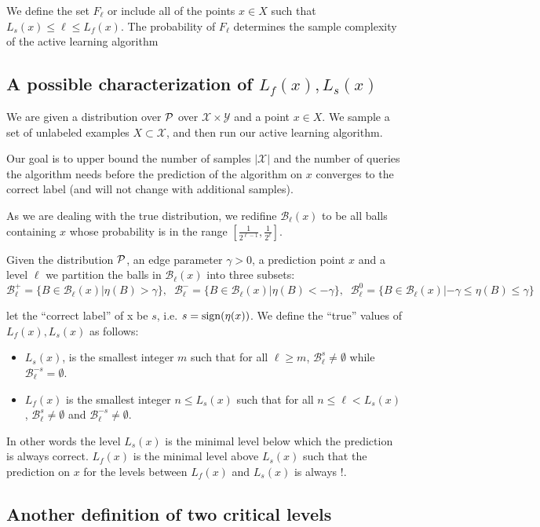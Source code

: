\documentclass{article}
\def\X{{\mathcal X}}
\def\Y{{\mathcal Y}}
\def\B{{\mathcal B}}
\def\sign{{\rm sign}}
\begin{document}
We define the set $F_\ell$ or include all of the points $x \in X$ such that $L_s(x) \leq \ell \leq L_f(x)$. The probability of $F_\ell$ determines the sample complexity of the active learning algorithm

\subsection{A possible characterization of $L_f(x),L_s(x)$}

\renewcommand{\P}{{\cal P}}
We are given a distribution over $\P$ over $\X \times \Y$ and a point $x \in X$.
We sample a set of unlabeled examples $X \subset \X$, and then run our active learning algorithm.

Our goal is to upper bound the number of samples $|\X|$ and the number
of queries the algorithm needs before the prediction of the algorithm
on $x$ converges to the correct label (and will not change with additional samples).

As we are dealing with the true distribution, we redifine $\B_\ell(x)$
to be all balls containing $x$ whose probability is in the range
$\left[ \frac{1}{2^{\ell-1}}, \frac{1}{2^\ell}\right]$.

Given the distribution $\P$, an edge parameter $\gamma>0$, a
prediction point $x$ and a level $\ell$ we partition the balls in $\B_{\ell}(x)$ into three 
subsets:
$$\B_{\ell}^+ = \{ B \in \B_\ell(x) | \eta(B)  > \gamma\},\;\;
\B_{\ell}^- = \{ B \in \B_\ell(x) | \eta(B)  < -\gamma\},\;\;
\B_{\ell}^0 = \{ B \in \B_\ell(x) | -\gamma \leq \eta(B) \leq \gamma\}$$

let the ``correct label'' of x be $s$, i.e. $s = \sign(\eta(x))$.
We define the ``true'' values of  $L_f(x),L_s(x)$ as follows:
\begin{itemize}
\item $L_s(x)$, is the smallest integer $m$ such that for all $\ell\geq
  m$, $\B_\ell^s \neq \emptyset$ while $\B_\ell^{-s} = \emptyset$.
\item $L_f(x)$ is the smallest integer $n \leq L_s(x)$ such that for
  all $n\leq \ell < L_s(x)$, $\B_\ell^s \neq \emptyset$ and $\B_\ell^{-s} \neq \emptyset$.
\end{itemize}

In other words the level $L_s(x)$ is the minimal level below which the
prediction is always correct. $L_f(x)$ is the minimal level above $L_s(x)$
such that the prediction on $x$ for the levels between  $L_f(x)$ and
$L_s(x)$ is always $!$.

\subsection{Another definition of two critical levels}
\end{document}
